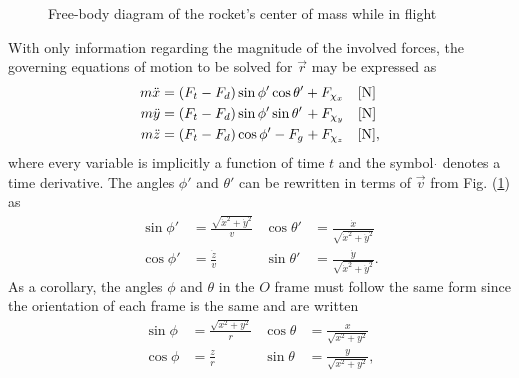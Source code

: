 \documentclass[11pt]{thesis}
\numberwithin{equation}{section}
\begin{document}
\begin{figure}[H]
\begin{center}
\end{center}
\caption{Free-body diagram of the rocket's center of mass while in flight}
\label{fig:FBD}
\end{figure}
With only information regarding the magnitude of the involved forces, the governing equations of motion to be solved for $\vec{r}$ may be expressed as
\begin{align}
m \ddot{x} &= \left(F_t - F_d\right) \sin\phi' \cos\theta' + F_{\chi_x} \quad [\si{\N}] \, \label{eq:mxdd} \\
m \ddot{y} &= \left(F_t - F_d\right) \sin\phi' \sin\theta' \hspace*{0.3ex} + F_{\chi_y} \quad [\si{\N}] \, \label{eq:mydd} \\
m \ddot{z} &= \left(F_t - F_d\right) \cos\phi' - F_g \hspace*{0.1ex} + F_{\chi_z} \quad [\si{\N}], \label{eq:mzdd} 
\end{align}
where every variable is implicitly a function of time $t$ and the symbol $\dot{}$ denotes a time derivative. The angles $\phi'$ and $\theta'$ can be rewritten in terms of $\vec{v}$ from Fig. (\ref{fig:FBD}) as
\begin{align}
\sin\phi' &= \frac{\sqrt{\dot{x}^2 + \dot{y}^2}}{v} & \cos\theta' &= \frac{\dot{x}}{\sqrt{\dot{x}^2 + \dot{y}^2}} \label{theta'phi'}\\
\cos\phi' &= \frac{\dot{z}}{v} & \sin\theta' &= \frac{\dot{y}}{\sqrt{\dot{x}^2 + \dot{y}^2}}.
\end{align}
As a corollary, the angles $\phi$ and $\theta$ in the $\mathit{O}$ frame must follow the same form since the orientation of each frame is the same and are written
\begin{align}
\sin\phi &= \frac{\sqrt{x^2 + y^2}}{r} & \cos\theta &= \frac{x}{\sqrt{x^2 + y^2}} \\
\cos\phi &= \frac{z}{r} & \sin\theta &= \frac{y}{\sqrt{x^2 + y^2}}, \label{thetaphi}
\end{align}
\end{document}

